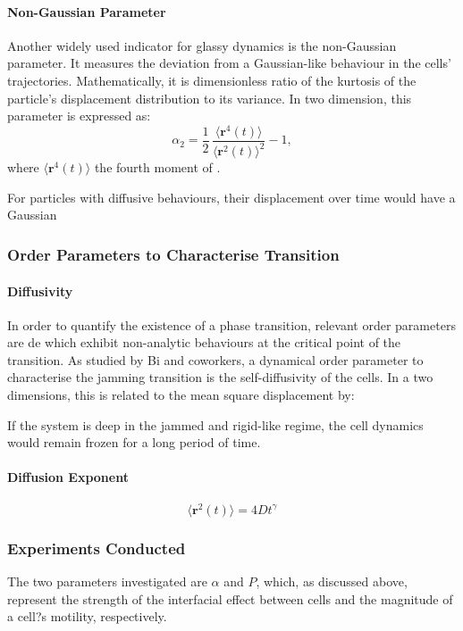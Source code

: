 \documentclass[a4paper,12pt]{article}
\begin{document}
\paragraph{Non-Gaussian Parameter}
Another widely used indicator for glassy dynamics is the non-Gaussian parameter. It measures the deviation from a Gaussian-like behaviour in the cells' trajectories. Mathematically, it is dimensionless ratio of the kurtosis of the particle's displacement distribution to its variance. In two dimension, this parameter is expressed as:
\begin{equation}
\alpha_2 = \frac{1}{2}\,\frac{\langle{\bm{r}^4(t)\rangle}}{\langle{\bm{r}^2(t)\rangle}^2} - 1,
\end{equation}
where $\langle{\bm{r}^4(t)\rangle}$ the fourth moment of . 

 For particles with diffusive behaviours, their displacement over time would have a Gaussian

\subsubsection{Order Parameters to Characterise Transition}
\paragraph{Diffusivity}
In order to quantify the existence of a phase transition, relevant order parameters are de which exhibit non-analytic behaviours at the critical point of the transition. As studied by Bi and coworkers, a dynamical order parameter to characterise the jamming transition is the self-diffusivity  of the cells. In a two dimensions, this is related to the mean square displacement by:

If the system is deep in the jammed and rigid-like regime, the cell dynamics would remain frozen for a long period of time. 

\paragraph{Diffusion Exponent}

\begin{equation}
\langle\bm{r}^2(t)\rangle = 4Dt^{\gamma}
\end{equation}

\subsubsection{Experiments Conducted}
The two parameters investigated are $\alpha$ and $P$, which, as discussed above, represent the strength of the interfacial effect between cells and the magnitude of a cell?s motility, respectively. 
\end{document}
